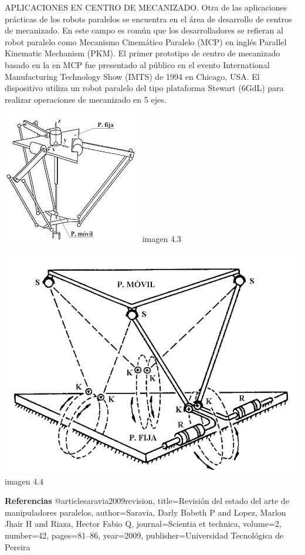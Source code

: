 \documentclass[10pt,a4paper]{article}
\begin{document}
APLICACIONES EN CENTRO DE MECANIZADO.
Otra de las aplicaciones prácticas de los robots paralelos se encuentra en el área de desarrollo de
centros de mecanizado. En este campo es común que los desarrolladores se refieran al robot paralelo
como Mecanismo Cinemático Paralelo (MCP) en inglés Parallel Kinematic Mechanism (PKM). El
primer prototipo de centro de mecanizado basado en la en MCP fue presentado al público en el evento
International Manufacturing Technology Show (IMTS) de 1994 en Chicago, USA. El dispositivo utiliza
un robot paralelo del tipo plataforma Stewart (6GdL) para realizar operaciones de mecanizado en 5 ejes.
\begin{center}
\includegraphics[scale=1.4]{imagenes/44.png} imagen 4.3
\end{center}
\begin{center}
\includegraphics[scale=0.3]{imagenes/66.png} imagen 4.4
\end{center}

\textbf{Referencias}
@article{saravia2009revision,
  title={Revisi{\'o}n del estado del arte de manipuladores paralelos},
  author={Saravia, Darly Babeth P and Lopez, Marlon Jhair H and Riaza, Hector Fabio Q},
  journal={Scientia et technica},
  volume={2},
  number={42},
  pages={81--86},
  year={2009},
  publisher={Universidad Tecnol{\'o}gica de Pereira}
}
\end{document}
